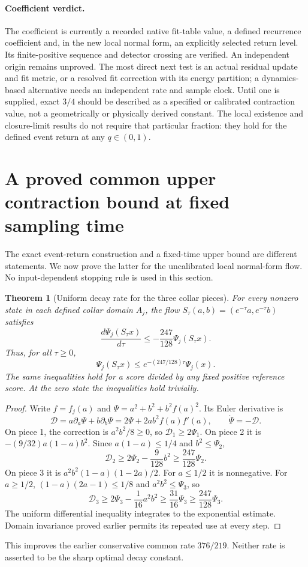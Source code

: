 \documentclass[11pt,a4paper]{article}
\newtheorem{theorem}{Theorem}
\begin{document}
\paragraph{Coefficient verdict.}
The coefficient is currently a recorded native fit-table value, a defined
recurrence coefficient and, in the new local normal form, an explicitly
selected return level. Its finite-positive sequence and detector crossing
are verified. An independent origin remains unproved. The most direct next
test is an actual residual update and fit metric, or a resolved fit correction
with its energy partition; a dynamics-based alternative needs an independent
rate and sample clock. Until one is supplied, exact $3/4$ should be described
as a specified or calibrated contraction value, not a geometrically or
physically derived constant. The local existence and closure-limit results
do not require that particular fraction: they hold for the defined event
return at any $q\in(0,1)$.

\section{A proved common upper contraction bound at fixed sampling time}
\label{sec:common-upper-contraction}
The exact event-return construction and a fixed-time upper bound are
different statements. We now prove the latter for the uncalibrated local
normal-form flow. No input-dependent stopping rule is used in this section.

\begin{theorem}[Uniform decay rate for the three collar pieces]
\label{thm:sharper-common-decay}
For every nonzero state in each defined collar domain $A_j$, the flow
$S_\tau(a,b)=(e^{-\tau}a,e^{-\tau}b)$ satisfies
\[
\frac{d\Psi_j(S_\tau x)}{d\tau}
\le-\frac{247}{128}\Psi_j(S_\tau x).
\]
Thus, for all $\tau\ge0$,
\[
\Psi_j(S_\tau x)\le e^{-(247/128)\tau}\Psi_j(x).
\]
The same inequalities hold for a score divided by any fixed positive
reference score. At the zero state the inequalities hold trivially.
\end{theorem}
\begin{proof}
Write $f=f_j(a)$ and $\Psi=a^2+b^2+b^2f(a)^2$. Its Euler derivative is
\[
\mathcal D=a\partial_a\Psi+b\partial_b\Psi
=2\Psi+2ab^2f(a)f'(a),\qquad\dot\Psi=-\mathcal D.
\]
On piece 1, the correction is $a^2b^2/8\ge0$, so
$\mathcal D_1\ge2\Psi_1$.
On piece 2 it is $-(9/32)a(1-a)b^2$. Since
$a(1-a)\le1/4$ and $b^2\le\Psi_2$,
\[
\mathcal D_2\ge2\Psi_2-\frac9{128}b^2
\ge\frac{247}{128}\Psi_2.
\]
On piece 3 it is $a^2b^2(1-a)(1-2a)/2$.
For $a\le1/2$ it is nonnegative. For $a\ge1/2$,
$(1-a)(2a-1)\le1/8$ and $a^2b^2\le\Psi_3$, so
\[
\mathcal D_3\ge2\Psi_3-\frac1{16}a^2b^2
\ge\frac{31}{16}\Psi_3
\ge\frac{247}{128}\Psi_3.
\]
The uniform differential inequality integrates to the exponential estimate.
Domain invariance proved earlier permits its repeated use at every step.
\end{proof}
This improves the earlier conservative common rate $376/219$.
Neither rate is asserted to be the sharp optimal decay constant.
\end{document}
